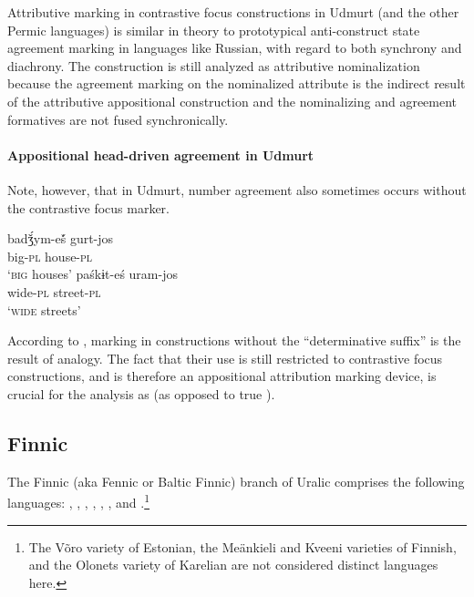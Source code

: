 Attributive marking in contrastive focus constructions in Udmurt (and the other Permic languages) is similar in theory to prototypical anti\hyp{}construct state agreement marking in languages like Russian, with regard to both synchrony and diachrony. The construction is still analyzed as attributive nominalization because the agreement marking on the nominalized attribute is the indirect result of the attributive appositional construction and the nominalizing and agreement formatives are not fused synchronically.

\paragraph*{Appositional head\hyp{}driven agreement in Udmurt}
Note, however, that in Udmurt, number agreement also sometimes occurs without the contrastive focus marker.
\begin{exe}
\begin{xlist}
\ex 
\gll	badǯ́ym-eš́ gurt-jos\\
	big-\textsc{pl} house-\textsc{pl}\\
\glt	‘\textsc{big} houses’ \citep[40]{winkler2001}
\ex 
\gll	paśkɨt-eś uram-jos\\
	wide-\textsc{pl} street-\textsc{pl}\\
\glt	‘\textsc{wide} streets’ \citep[63]{csucs1990}
\end{xlist}
\end{exe}
According to \citet[63]{csucs1990},  marking in constructions without the “determinative suffix” is the result of analogy. The fact that their use is still restricted to contrastive focus constructions, and is therefore an appositional attribution marking device, is crucial for the analysis as  (as opposed to true ).

\subsection{Finnic}
The Finnic (aka Fennic or Baltic Finnic) branch of Uralic comprises the following languages: , , , , , ,  and .\footnote{The Võro variety of Estonian, the Meänkieli and Kveeni varieties of Finnish, and the Olonets variety of Karelian are not considered distinct languages here.}

